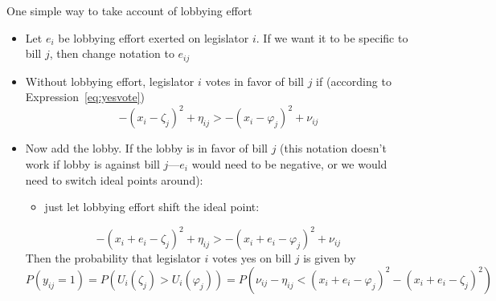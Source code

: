 \documentclass[12pt]{article}
\begin{document}
\newpage
One simple way to take account of lobbying effort
\begin{itemize}
	\item Let $e_i$ be lobbying effort exerted on legislator $i$. If we want it to be specific to bill $j$, then change notation to $e_{ij}$
	\item Without lobbying effort, legislator $i$ votes in favor of bill $j$ if (according to Expression~\ref{eq:yesvote})
		\[
		  - \left( x_i - \zeta_j \right)^2 + \eta_{ij} > - \left( x_i - \varphi_j \right)^2 + \nu_{ij}
		\]
	\item Now add the lobby. If the lobby is in favor of bill $j$ (this notation doesn't work if lobby is against bill $j$---$e_i$ would need to be negative, or we would need to switch ideal points around):
		\begin{itemize}
			\item just let lobbying effort shift the ideal point:
		\end{itemize}
		\[
		  - \left( x_i + e_i - \zeta_j \right)^2 + \eta_{ij} > - \left( x_i + e_i - \varphi_j \right)^2 + \nu_{ij}
		\]
    Then the probability that legislator $i$ votes yes on bill $j$ is given by
		\begin{equation}
		  P\left(y_{ij}=1\right) = P\left(U_i(\zeta_j) > U_i(\varphi_j)\right) = P\left(\nu_{ij} - \eta_{ij} <  \left( x_i + e_i - \varphi_j \right)^2 - \left( x_i + e_i - \zeta_j \right)^2\right)
		\label{eq:yeswe}
		\end{equation}
\end{itemize}
\end{document}
